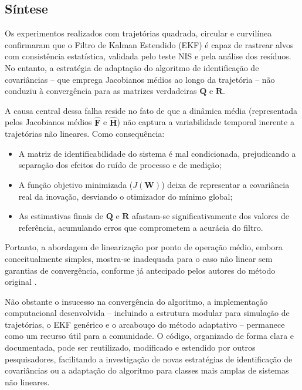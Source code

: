 \documentclass[journal]{IEEEtran}
\begin{document}
\subsection{Síntese}

Os experimentos realizados com trajetórias quadrada, circular e curvilínea confirmaram que o Filtro de Kalman Estendido (EKF) é capaz de rastrear alvos com consistência estatística, validada pelo teste NIS e pela análise dos resíduos. No entanto, a estratégia de adaptação do algoritmo de identificação de covariâncias – que emprega Jacobianos médios ao longo da trajetória – não conduziu à convergência para as matrizes verdadeiras $\mathbf{Q}$ e $\mathbf{R}$.

A causa central dessa falha reside no fato de que a dinâmica média (representada pelos Jacobianos médios $\hat{\mathbf{F}}$ e $\hat{\mathbf{H}}$) não captura a variabilidade temporal inerente a trajetórias não lineares. Como consequência:

\begin{itemize}
    \item A matriz de identificabilidade do sistema é mal condicionada, prejudicando a separação dos efeitos do ruído de processo e de medição;
    \item A função objetivo minimizada ($J(\mathbf{W})$) deixa de representar a covariância real da inovação, desviando o otimizador do mínimo global;
    \item As estimativas finais de $\mathbf{Q}$ e $\mathbf{R}$ afastam-se significativamente dos valores de referência, acumulando erros que comprometem a acurácia do filtro.
\end{itemize}

Portanto, a abordagem de linearização por ponto de operação médio, embora conceitualmente simples, mostra-se inadequada para o caso não linear sem garantias de convergência, conforme já antecipado pelos autores do método original \cite{zhang2020}.

Não obstante o insucesso na convergência do algoritmo, a implementação computacional desenvolvida – incluindo a estrutura modular para simulação de trajetórias, o EKF genérico e o arcabouço do método adaptativo – permanece como um recurso útil para a comunidade. O código, organizado de forma clara e documentada, pode ser reutilizado, modificado e estendido por outros pesquisadores, facilitando a investigação de novas estratégias de identificação de covariâncias ou a adaptação do algoritmo para classes mais amplas de sistemas não lineares.
\end{document}
